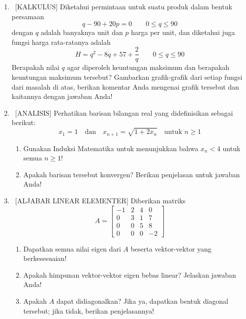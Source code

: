 \documentclass[10pt,a4paper]{article}
\begin{document}
\begin{enumerate}
  \item \ [KALKULUS] Diketahui permintaan untuk suatu produk dalam bentuk persamaan
        \[ q- 90 + 20p=0 \qquad 0 \le q \le 90 \]
        dengan $q$ adalah banyaknya unit dan $p$ harga per unit, dan diketahui juga fungsi harga rata-ratanya adalah
        \[ H = q^2 - 8q + 57 + \frac{2}{q} \qquad 0 \le q \le 90 \]
        Berapakah nilai $q$ agar diperoleh keuntungan maksimum dan berapakah keuntungan maksimum tersebut? Gambarkan grafik-grafik dari setiap fungsi dari masalah di atas, berikan komentar Anda mengenai grafik tersebut dan kaitannya dengan jawaban Anda!

  \item \ [ANALISIS] Perhatikan barisan bilangan real yang didefinisikan sebagai berikut:
        \[ x_1 = 1 \quad \text{dan} \quad x_{n+1} = \sqrt{1 + 2x_n} \quad \text{untuk } n \ge 1 \]
        \begin{enumerate}
          \item Gunakan Induksi Matematika untuk menunjukkan bahwa $x_n < 4$ untuk semua $n \ge 1$!
          \item Apakah barisan tersebut konvergen? Berikan penjelasan untuk jawaban Anda!
        \end{enumerate}

  \item \ [ALJABAR LINEAR ELEMENTER] Diberikan matriks
        \[ A = \begin{bmatrix}
            -1 & 2 & 4 & 0  \\
            0  & 3 & 1 & 7  \\
            0  & 0 & 5 & 8  \\
            0  & 0 & 0 & -2
          \end{bmatrix} \]
        \begin{enumerate}
          \item Dapatkan semua nilai eigen dari $A$ beserta vektor-vektor yang berkesesuaian!
          \item Apakah himpunan vektor-vektor eigen bebas linear? Jelaskan jawaban Anda!
          \item Apakah $A$ dapat didiagonalkan? Jika ya, dapatkan bentuk diagonal tersebut; jika tidak, berikan penjelasannya!
        \end{enumerate}


\end{enumerate}
\end{document}
